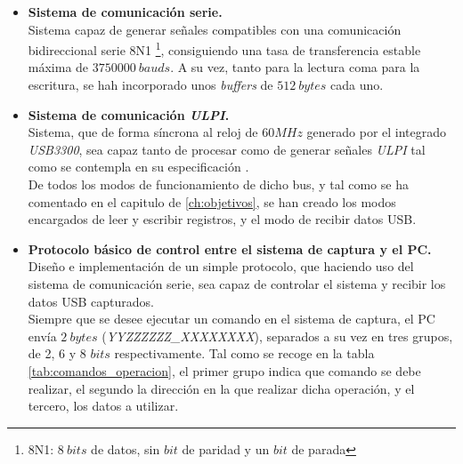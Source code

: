 \begin{itemize}
    \item \textbf{Sistema de comunicación serie.} \\
    Sistema capaz de generar señales compatibles con una comunicación bidireccional serie 8N1 \footnote{8N1: $8~bits$ de datos, sin $bit$ de paridad y un $bit$ de parada}, consiguiendo una tasa de transferencia estable máxima de $3750000~bauds$. A su vez, tanto para la lectura coma para la escritura, se hah incorporado unos \emph{buffers} de $512~bytes$ cada uno.
    
    \item \textbf{Sistema de comunicación \textit{ULPI}.} \\
    Sistema, que de forma síncrona al reloj de $60MHz$ generado por el integrado \emph{USB3300}, sea capaz tanto de procesar como de generar señales \textit{ULPI} tal como se contempla en su especificación \cite{ulpi-specs}. \\
    De todos los modos de funcionamiento de dicho bus, y tal como se ha comentado en el capitulo de \ref{ch:objetivos}, se han creado los modos encargados de leer y escribir registros, y el modo de recibir datos USB.
    
    \item \textbf{Protocolo básico de control entre el sistema de captura y el PC.} \\
    Diseño e implementación de un simple protocolo, que haciendo uso del sistema de comunicación serie, sea capaz de controlar el sistema y recibir los datos USB capturados. \\
    Siempre que se desee ejecutar un comando en el sistema de captura, el PC envía $2~bytes$ (\emph{YYZZZZZZ\_XXXXXXXX}), separados a su vez en tres grupos, de 2, 6 y 8 $bits$ respectivamente. Tal como se recoge en la tabla \ref{tab:comandos_operacion}, el primer grupo indica que comando se debe realizar, el segundo la dirección en la que realizar dicha operación, y el tercero, los datos a utilizar.


\end{itemize}
